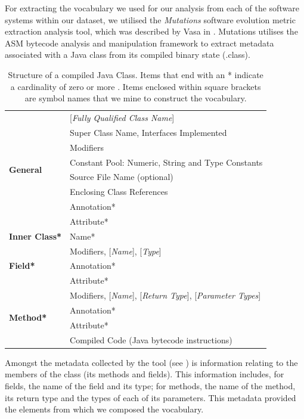 For extracting the vocabulary we used for our analysis from each of the software systems within our dataset, we utilised the \emph{Mutations} software evolution metric extraction analysis tool, which was described by Vasa in \cite{Vasa10a}. Mutations utilises the ASM bytecode analysis and manipulation framework to extract metadata associated with a Java class from its compiled binary state (.class).

\begin{table}[t]
\centering
\begin{tabular}{|l|p{}|}
	\hline
\multirow{8}{*}{\textbf{General}} & [\emph{Fully Qualified Class Name}] \\
 & Super Class Name, Interfaces Implemented \\
 & Modifiers \\ 
 & Constant Pool: Numeric, String and Type Constants\\
 & Source File Name (optional)\\
 & Enclosing Class References\\
 & Annotation*\\
 & Attribute*\\ \hline
 \textbf{Inner Class*} & Name* \\ \hline
\multirow{3}{*}{\textbf{Field*}} & Modifiers, [\emph{Name}], [\emph{Type}] \\ 
& Annotation* \\
& Attribute* \\ \hline
\multirow{4}{*}{\textbf{Method*}} & Modifiers, [\emph{Name}], [\emph{Return Type}], [\emph{Parameter Types}] \\ 
& Annotation* \\ 
& Attribute* \\ 
& Compiled Code (Java bytecode instructions) \\ \hline
\end{tabular}
\vspace{0.2cm}
\caption{Structure of a compiled Java Class. Items that end with an * indicate a cardinality of zero or more \cite{Lindholm99a}. Items enclosed within square brackets are symbol names that we mine to construct the vocabulary.}
\vspace{0.5cm}
\label{tab:class_structure}
\end{table}

Amongst the metadata collected by the tool (see ) is information relating to the members of the class (\ie its methods and fields). This information includes, for fields, the name of the field and its type; for methods, the name of the method, its return type and the types of each of its parameters. This metadata provided the elements from which we composed the vocabulary.


